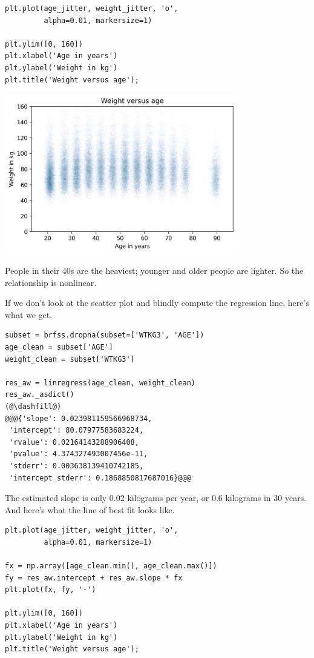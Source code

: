 \begin{lstlisting}[]
plt.plot(age_jitter, weight_jitter, 'o', 
         alpha=0.01, markersize=1)

plt.ylim([0, 160])
plt.xlabel('Age in years')
plt.ylabel('Weight in kg')
plt.title('Weight versus age');
\end{lstlisting}

\begin{center}
\includegraphics[width=4in]{chapters/09_relationships_files/09_relationships_102_0.png}
\end{center}

People in their 40s are the heaviest; younger and older people are
lighter. So the relationship is nonlinear.

If we don't look at the scatter plot and blindly compute the regression
line, here's what we get.

\begin{lstlisting}[]
subset = brfss.dropna(subset=['WTKG3', 'AGE'])
age_clean = subset['AGE']
weight_clean = subset['WTKG3']

res_aw = linregress(age_clean, weight_clean)
res_aw._asdict()
(@\dashfill@)
@@@{'slope': 0.023981159566968734,
 'intercept': 80.07977583683224,
 'rvalue': 0.02164143288906408,
 'pvalue': 4.374327493007456e-11,
 'stderr': 0.003638139410742185,
 'intercept_stderr': 0.1868850817687016}@@@
\end{lstlisting}

The estimated slope is only 0.02 kilograms per year, or 0.6 kilograms in
30 years. And here's what the line of best fit looks like.

\begin{lstlisting}[]
plt.plot(age_jitter, weight_jitter, 'o', 
         alpha=0.01, markersize=1)

fx = np.array([age_clean.min(), age_clean.max()])
fy = res_aw.intercept + res_aw.slope * fx
plt.plot(fx, fy, '-')

plt.ylim([0, 160])
plt.xlabel('Age in years')
plt.ylabel('Weight in kg')
plt.title('Weight versus age');
\end{lstlisting}

